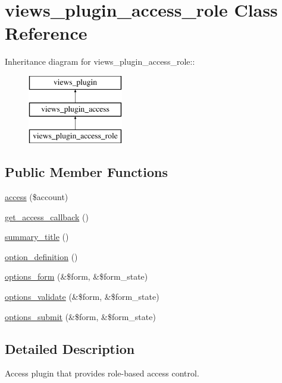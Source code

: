 \hypertarget{classviews__plugin__access__role}{
\section{views\_\-plugin\_\-access\_\-role Class Reference}
\label{classviews__plugin__access__role}
}
Inheritance diagram for views\_\-plugin\_\-access\_\-role::\begin{figure}[H]
\begin{center}
\leavevmode
\includegraphics[height=3cm]{classviews__plugin__access__role}
\end{center}
\end{figure}
\subsection*{Public Member Functions}
\begin{DoxyCompactItemize}
\item 
\hyperlink{classviews__plugin__access__role_a8de6032d940b90e06820cdbd9a15a51c}{access} (\$account)
\item 
\hyperlink{classviews__plugin__access__role_a50094384e297acdd629d9462004df69a}{get\_\-access\_\-callback} ()
\item 
\hyperlink{classviews__plugin__access__role_a25dbbc0f06093f0e4ee13182ea0d277f}{summary\_\-title} ()
\item 
\hyperlink{classviews__plugin__access__role_a76714a96150c4611683068a50be7eb26}{option\_\-definition} ()
\item 
\hyperlink{classviews__plugin__access__role_a76293d33e84a78e2ce0df6df955da760}{options\_\-form} (\&\$form, \&\$form\_\-state)
\item 
\hyperlink{classviews__plugin__access__role_a82fda91cd55acbbcac1759448c8fc471}{options\_\-validate} (\&\$form, \&\$form\_\-state)
\item 
\hyperlink{classviews__plugin__access__role_ad9bf6eddd91a7c224fb813a58077ee4d}{options\_\-submit} (\&\$form, \&\$form\_\-state)
\end{DoxyCompactItemize}


\subsection{Detailed Description}
Access plugin that provides role-\/based access control. 

